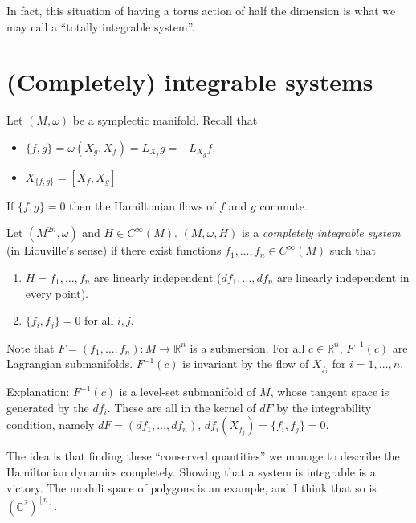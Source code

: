 In fact, this situation of having a torus action of half the dimension
is what we may call a ``totally integrable system''.

\section{(Completely) integrable systems}
\label{section-completely-integrable-systems}

\noindent
Let $(M,\omega)$ be a symplectic manifold.
Recall that

\begin{itemize}
\item $\{f,g\}=\omega(X_g,X_f)=L_{X_f}g=-L_{X_g}f$.
\item $X_{\{f,g\}}=[X_f,X_g]$
\end{itemize}

\noindent
If $\{f,g\}=0$ then the Hamiltonian flows of $f$ and $g$ commute.

\begin{definition}
\label{definition-completely-integrable-system}
Let $(M^{2n},\omega)$ and $H \in C^\infty(M)$.
$(M,\omega,H)$ is a {\it completely integrable system} 
(in Liouville's sense)
if there exist functions $f_1,\ldots,f_n \in C^\infty(M)$ such that
\begin{enumerate}
\item $H=f_1,\ldots,f_n$ are linearly independent
($df_1,\ldots,df_n$ are linearly independent in every point).

\item $\{ f_i, f_j\}=0$ for all $i,j$.
\end{enumerate}
\end{definition}

\noindent
Note that $F=(f_1,\ldots,f_n):M \to \mathbb{R}^n$ is a submersion.
For all $c \in \mathbb{R}^n$, $F^{-1}(c)$ 
are Lagrangian submanifolds.
$F^{-1}(c)$ is invariant by the flow of
$X_{f_i}$ for $i=1,\ldots,n$.

Explanation: $F^{-1}(c)$ is a level-set submanifold of $M$,
whose tangent space is generated by the $df_i$.
These are all in the kernel of $dF$ by the integrability condition,
namely $dF=(df_1,\ldots,df_n)$, $df_i(X_{f_j})=\{f_i,f_j\}=0$.

The idea is that finding these ``conserved quantities''
we manage to describe the Hamiltonian dynamics completely.
Showing that a system is integrable is a victory.
The moduli space of polygons is an example,
and I think that so is $(\mathbb{C}^2)^{[n]}$.

